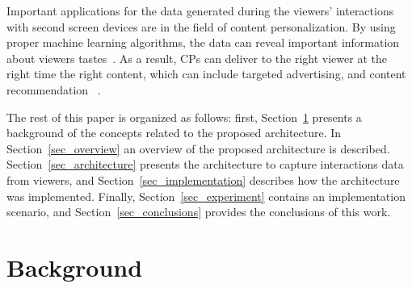\documentclass[journal]{IEEEtran}
\begin{document}
Important applications for the data generated during the viewers' interactions with second screen devices are in the field of content personalization. By using proper machine learning algorithms, the data can reveal important information about viewers tastes~\cite{Kim2012,Shin2009}. As a result, CPs can deliver to the right viewer at the right time the right content, which can include targeted advertising, and content recommendation ~\cite{DosSantos2013}.


The rest of this paper is organized as follows: first, Section~\ref{sec_background} presents a background of the concepts related to the proposed architecture. In Section~\ref{sec_overview} an overview of the proposed architecture is described. Section~\ref{sec_architecture} presents the architecture to capture interactions data from viewers, and Section~\ref{sec_implementation} describes how the architecture was implemented. Finally, Section~\ref{sec_experiment} contains 	an implementation scenario, and Section~\ref{sec_conclusions} provides the conclusions of this work.

\section{Background}
\label{sec_background}


\end{document}
